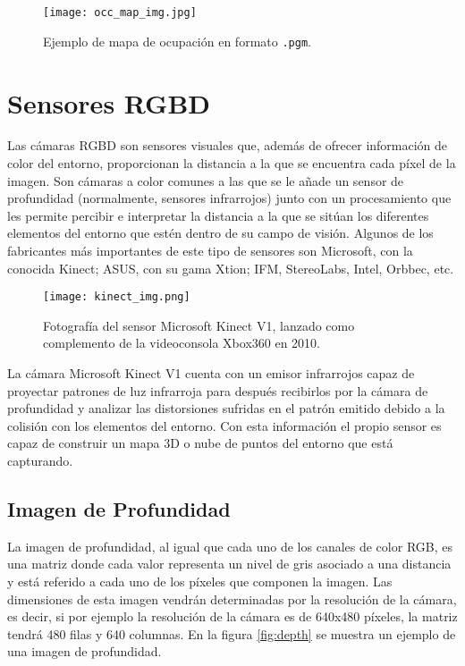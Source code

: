 \begin{figure}[h]
\begin{center} \label{fig:occ_map}
\texttt{[image: occ\_map\_img.jpg]}
\end{center}
\caption{Ejemplo de mapa de ocupación en formato \texttt{.pgm}.}
\end{figure}

\section{Sensores RGBD}

Las cámaras RGBD son sensores visuales que, además de ofrecer información de color del entorno, proporcionan la distancia a la que se encuentra cada píxel de la imagen. Son cámaras a color comunes a las que se le añade un sensor de profundidad (normalmente, sensores infrarrojos) junto con un procesamiento que les permite percibir e interpretar la distancia a la que se sitúan los diferentes elementos del entorno que estén dentro de su campo de visión. Algunos de los fabricantes más importantes de este tipo de sensores son Microsoft, con la conocida Kinect; ASUS, con su gama Xtion; IFM, StereoLabs, Intel, Orbbec, etc.\\

\begin{figure}[h]
	\begin{center} 
		\texttt{[image: kinect\_img.png]}
	\end{center}
	\caption{Fotografía del sensor Microsoft Kinect V1, lanzado como complemento de la videoconsola Xbox360 en 2010. \cite{kinectv1}}
	\label{fig:kinect}
\end{figure}

La cámara Microsoft Kinect V1 cuenta con un emisor infrarrojos capaz de proyectar patrones de luz infrarroja para después recibirlos por la cámara de profundidad y analizar las distorsiones sufridas en el patrón emitido debido a la colisión con los elementos del entorno. Con esta información el propio sensor es capaz de construir un mapa 3D o nube de puntos del entorno que está capturando.\\


\subsection{Imagen de Profundidad}

La imagen de profundidad, al igual que cada uno de los canales de color RGB, es una matriz donde cada valor representa un nivel de gris asociado a una distancia y está referido a cada uno de los píxeles que componen la imagen. Las dimensiones de esta imagen vendrán determinadas por la resolución de la cámara, es decir, si por ejemplo la resolución de la cámara es de 640x480 píxeles, la matriz tendrá 480 filas y 640 columnas. En la figura \ref{fig:depth} se muestra un ejemplo de una imagen de profundidad. \\

